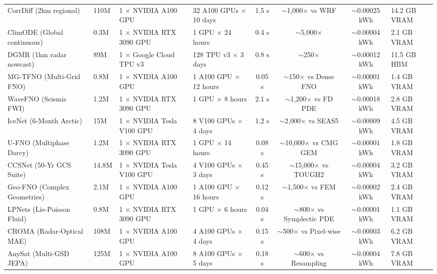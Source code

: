 \begin{table}[t]
{\begin{tabular}{@{}llp{2.6cm}p{3.2cm}cccp{2.6cm}@{}}
CorrDiff (2km regional)~\cite{mardani2023corrdiff} & 110M & 1 $\times$ NVIDIA A100 GPU & 32 A100 GPUs $\times$ 10 days & 1.5 s & $\sim$1,000$\times$ vs WRF & $\sim$0.00025 kWh & 14.2 GB VRAM \\
ClimODE (Global continuous)~\cite{verma2024climode} & 0.3M & 1 $\times$ NVIDIA RTX 3090 GPU & 1 GPU $\times$ 24 hours & 0.4 s & $\sim$5,000$\times$ & $\sim$0.00004 kWh & 2.1 GB VRAM \\
DGMR (1km radar nowcast)~\cite{ravuri2021dgmr} & 89M & 1 $\times$ Google Cloud TPU v3 & 128 TPU v3 $\times$ 3 days & 0.8 s & $\sim$250$\times$ & $\sim$0.00012 kWh & 11.5 GB HBM \\
MG-TFNO (Multi-Grid FNO)~\cite{kossaifi2024multigrid} & 0.8M & 1 $\times$ NVIDIA A100 GPU & 1 A100 GPU $\times$ 12 hours & 0.05 s & $\sim$150$\times$ vs Dense FNO & $\sim$0.00001 kWh & 1.4 GB VRAM \\
WaveFNO (Seismic FWI)~\cite{yang2021seismic} & 1.2M & 1 $\times$ NVIDIA RTX 3090 GPU & 1 GPU $\times$ 8 hours & 2.1 s & $\sim$1,200$\times$ vs FD PDE & $\sim$0.00018 kWh & 2.8 GB VRAM \\
IceNet (6-Month Arctic)~\cite{andersson2021icenet} & 15M & 1 $\times$ NVIDIA Tesla V100 GPU & 8 V100 GPUs $\times$ 4 days & 1.2 s & $\sim$2,000$\times$ vs SEAS5 & $\sim$0.00009 kWh & 4.5 GB VRAM \\
U-FNO (Multiphase Darcy)~\cite{wen2022ufno} & 1.2M & 1 $\times$ NVIDIA RTX 3090 GPU & 1 GPU $\times$ 14 hours & 0.08 s & $\sim$10,000$\times$ vs CMG GEM & $\sim$0.00001 kWh & 1.8 GB VRAM \\
CCSNet (50-Yr GCS Suite)~\cite{wen2021ccsnet} & 14.8M & 1 $\times$ NVIDIA Tesla V100 GPU & 4 V100 GPUs $\times$ 3 days & 0.45 s & $\sim$15,000$\times$ vs TOUGH2 & $\sim$0.00004 kWh & 3.2 GB VRAM \\
Geo-FNO (Complex Geometries)~\cite{li2022geofno} & 2.1M & 1 $\times$ NVIDIA A100 GPU & 1 A100 GPU $\times$ 16 hours & 0.12 s & $\sim$1,500$\times$ vs FEM & $\sim$0.00002 kWh & 2.4 GB VRAM \\
LPNets (Lie-Poisson Fluid)~\cite{eldred2023lpnets} & 0.8M & 1 $\times$ NVIDIA RTX 3090 GPU & 1 GPU $\times$ 6 hours & 0.04 s & $\sim$800$\times$ vs Symplectic PDE & $\sim$0.00001 kWh & 1.1 GB VRAM \\
CROMA (Radar-Optical MAE)~\cite{fuller2023croma} & 108M & 1 $\times$ NVIDIA A100 GPU & 4 A100 GPUs $\times$ 4 days & 0.15 s & $\sim$500$\times$ vs Pixel-wise & $\sim$0.00003 kWh & 6.2 GB VRAM \\
AnySat (Multi-GSD JEPA)~\cite{astruc2024anysat} & 125M & 1 $\times$ NVIDIA A100 GPU & 8 A100 GPUs $\times$ 5 days & 0.18 s & $\sim$600$\times$ vs Resampling & $\sim$0.00004 kWh & 7.8 GB VRAM \\

\end{tabular}}
\end{table}
